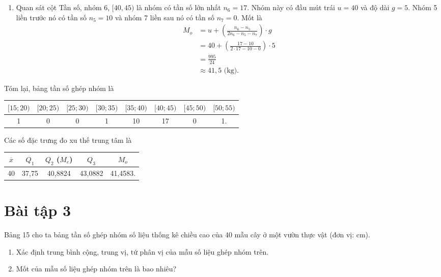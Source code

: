 \documentclass[
  letterpaper,
  DIV=11,
  numbers=noendperiod]{scrartcl}
\providecommand{\tightlist}{%
  \setlength{\itemsep}{0pt}\setlength{\parskip}{0pt}}\usepackage{longtable,booktabs,array}
\begin{document}
\begin{enumerate}
\def\labelenumi{\alph{enumi}.}
\setcounter{enumi}{2}
\tightlist
\item
  Quan sát cột Tần số, nhóm 6, \([40,45)\) là nhóm có tần số lớn nhất
  \(n_6=17\). Nhóm này có đầu mút trái \(u=40\) và độ dài \(g=5\). Nhóm
  5 liền trước nó có tần số \(n_5=10\) và nhóm 7 liền sau nó có tần số
  \(n_7=0\). Mốt là \begin{align*}
       M_o 
           & = u + \left(\frac{n_6-n_5}{2n_6 - n_5 - n_7}\right)\cdot g \\
           & = 40 + \left(\frac{17-10}{2\cdot 17 - 10 - 0}\right)\cdot 5 \\
           & = \frac{995}{24} \\
           & \approx 41,5 \text{ (kg).}
   \end{align*}
\end{enumerate}

Tóm lại, bảng tần số ghép nhóm là

\begin{center}
\begin{tabular}{|c|c|c|c|c|c|c|c|}
\hline 
$[15;20)$ & $[20; 25)$ & $[25; 30)$ & $[30; 35)$ & $[35;40)$ & $[40; 45)$ & $[45;50)$ & $[50;55)$ \\
\hline 
1 & 0 & 0 & 1 & 10 & 17 & 0 & 1. \\
\hline
\end{tabular}
\end{center}

Các số đặc trưng đo xu thế trung tâm là

\begin{center}
\begin{tabular}{|c|c|c|c|c|}
\hline
$\overline{x}$ & $Q_1$ & $Q_2$ ($M_e$) & $Q_3$ & $M_o$ \\
\hline
40 & 37,75 & 40,8824 & 43,0882 & 41,4583. \\
\hline 
\end{tabular}
\end{center}

\section*{Bài tập 3}

Bảng 15 cho ta bảng tần số ghép nhóm số liệu thống kê chiều cao của 40
mẫu cây ở một vườn thực vật (đơn vị: cm).

\begin{enumerate}
\def\labelenumi{\alph{enumi}.}
\item
  Xác định trung bình cộng, trung vị, tứ phân vị của mẫu số liệu ghép
  nhóm trên.
\item
  Mốt của mẫu số liệu ghép nhóm trên là bao nhiêu?
\end{enumerate}
\end{document}
